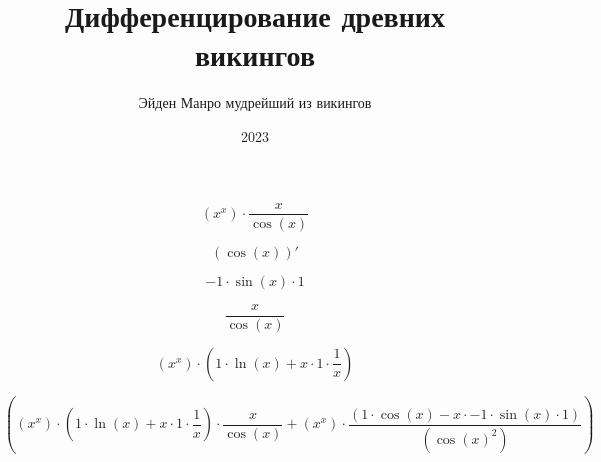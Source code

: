 \documentclass[a4paper,12pt]{article}
\title{\textbf{Дифференцирование древних викингов}}
\author{Эйден Манро мудрейший из викингов}
\date{2023}
\begin{document}
\maketitle


\begin{center}
\begin{equation}
(x^{x}) \cdot  \frac{x }{ \cos(x) } 
\end{equation}
\end{center}



\begin{center}
\begin{equation}
(\cos(x))'
\end{equation}
\end{center}



\begin{center}
\begin{equation}
-1 \cdot \sin(x) \cdot 1
\end{equation}
\end{center}



\begin{center}
\begin{equation}
 \frac{x }{ \cos(x) } 
\end{equation}
\end{center}



\begin{center}
\begin{equation}
(x^{x}) \cdot (1 \cdot \ln(x) + x \cdot 1 \cdot  \frac{1 }{ x } )
\end{equation}
\end{center}



\begin{center}
\begin{equation}
((x^{x}) \cdot (1 \cdot \ln(x) + x \cdot 1 \cdot  \frac{1 }{ x } ) \cdot  \frac{x }{ \cos(x) }  + (x^{x}) \cdot  \frac{(1 \cdot \cos(x) - x \cdot -1 \cdot \sin(x) \cdot 1) }{ (\cos(x)^{2}) } )
\end{equation}
\end{center}
\end{document}
